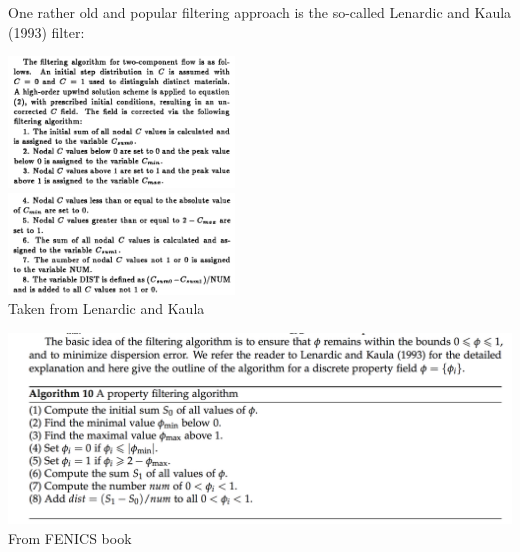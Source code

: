 One rather old and popular filtering approach is the so-called Lenardic and Kaula (1993) \cite{leka93}
filter:

\begin{center}
\includegraphics[width=6cm]{images/compositions/leka93_filter1}\\
\includegraphics[width=6cm]{images/compositions/leka93_filter2}\\
{\captionfont Taken from Lenardic and Kaula \cite{leka93}}
\end{center}

\begin{center}
\includegraphics[width=16cm]{images/compositions/leka93_filter3}\\
{\captionfont From FENICS book}
\end{center}


